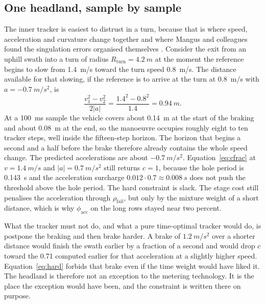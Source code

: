 \subsection{One headland, sample by sample}

The inner tracker is easiest to distrust in a turn, because that is where speed, acceleration and curvature change together and where Mangus and colleagues found the singulation errors organised themselves \cite{mangus2017}. Consider the exit from an uphill swath into a turn of radius \(R_{\mathrm{turn}}=\SI{4.2}{m}\) at the moment the reference begins to slow from \SI{1.4}{m/s} toward the turn speed \SI{0.8}{m/s}. The distance available for that slowing, if the reference is to arrive at the turn at \SI{0.8}{m/s} with \(a=-\SI{0.7}{m/s^2}\), is
\begin{equation}
\label{eq:brake}
\frac{v_1^2-v_2^2}{2|a|} = \frac{1.4^2-0.8^2}{1.4} = \SI{0.94}{m}.
\end{equation}
At a \SI{100}{ms} sample the vehicle covers about \SI{0.14}{m} at the start of the braking and about \SI{0.08}{m} at the end, so the manoeuvre occupies roughly eight to ten tracker steps, well inside the fifteen-step horizon. The horizon that begins a second and a half before the brake therefore already contains the whole speed change. The predicted accelerations are about \(-\SI{0.7}{m/s^2}\). Equation~\eqref{eq:cfrac} at \(v=\SI{1.4}{m/s}\) and \(|a|=\SI{0.7}{m/s^2}\) still returns \(c=1\), because the hole period is \SI{0.143}{s} and the acceleration surcharge \(0.012\cdot 0.7\approx\SI{0.008}{s}\) does not push the threshold above the hole period. The hard constraint is slack. The stage cost still penalises the acceleration through \(\rho_{\mathrm{fail}}\), but only by the mixture weight of a short distance, which is why \(\phi_{\mathrm{acc}}\) on the long rows stayed near two percent.

What the tracker must not do, and what a pure time-optimal tracker would do, is postpone the braking and then brake harder. A brake of \(\SI{1.2}{m/s^2}\) over a shorter distance would finish the swath earlier by a fraction of a second and would drop \(c\) toward the \num{0.71} computed earlier for that acceleration at a slightly higher speed. Equation~\eqref{eq:hard} forbids that brake even if the time weight would have liked it. The headland is therefore not an exception to the metering technology. It is the place the exception would have been, and the constraint is written there on purpose.

